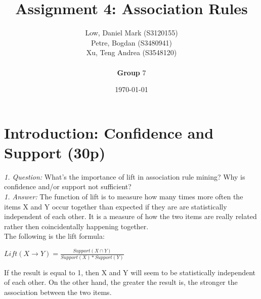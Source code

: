 \documentclass[a4paper]{article}
\title{Assignment 4: Association Rules}
\author{
	Low, Daniel Mark (S3120155) \\
	Petre, Bogdan (S3480941) \\
	Xu, Teng Andrea (S3548120) \\ 
	\\ \textbf{Group} 7}
\date{\today}
\begin{document}
	\maketitle
	
	\section{Introduction: Confidence and Support (30p)}
	
	\textit{1. Question:} What’s the importance of lift in association rule mining? Why is confidence and/or
	support not sufficient?\\
	\textit{1. Answer:} The function of lift is to measure how many times more often the items X and Y occur together than expected if they are are statistically independent of each other. It is a measure of how the two items are really related rather then coincidentally happening together.\\
	The following is the lift formula:
	
	\begin{center}
		$Lift(X\rightarrow Y)=  \frac{Support(X \cap  Y)}{Support(X)*Support(Y)}$ 
	\end{center}
	If the result is equal to 1, then X and Y will seem to be statistically independent of each other. On the other hand, the greater the result is, the stronger the association between the two items.
	
\end{document}
